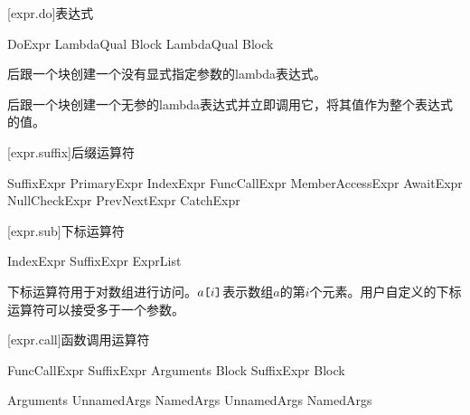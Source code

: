 [expr.do]{表达式}

\begin{bnf}{DoExpr}
    LambdaQual\bnfs {} Block \br
    LambdaQual\bnfs {} \terminal{!} Block
\end{bnf}

\pnum
{}后跟一个块创建一个没有显式指定参数的lambda表达式。

\pnum
{}后跟一个块创建一个无参的lambda表达式并立即调用它，将其值作为整个表达式的值。

\enterexample
{}
\exitexample

[expr.suffix]{后缀运算符}

\begin{bnf}{SuffixExpr}
    PrimaryExpr \br
    IndexExpr \br
    FuncCallExpr \br
    MemberAccessExpr \br
    AwaitExpr \br
    NullCheckExpr \br
    PrevNextExpr \br
    CatchExpr
\end{bnf}

[expr.sub]{下标运算符}

\begin{bnf}{IndexExpr}
    SuffixExpr \terminal{[} ExprList\bnfq \terminal{]}
\end{bnf}

\pnum
下标运算符用于对数组进行访问。$a\texttt{[}i\texttt{]}$表示数组$a$的第$i$个元素。用户自定义的下标运算符可以接受多于一个参数。

[expr.call]{函数调用运算符}

\begin{bnf}{FuncCallExpr}
    SuffixExpr \terminal{(} Arguments\bnfq \terminal{)} Block\bnfs \br
    SuffixExpr Block
\end{bnf}

\begin{bnf}{Arguments}
    UnnamedArgs \br
    NamedArgs \br
    UnnamedArgs \terminal{,} NamedArgs
\end{bnf}

